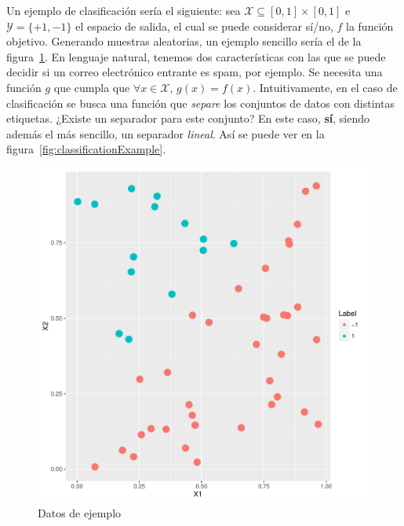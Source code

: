 \documentclass[a4paper,11pt]{book}\usepackage[]{graphicx}\usepackage[]{color}
\makeatletter
\def\maxwidth{ %
  \ifdim\Gin@nat@width>\linewidth
    \linewidth
  \else
    \Gin@nat@width
  \fi
}
\newenvironment{knitrout}{}{} %
\theoremstyle{plain}
\theoremstyle{definition}
\makeatother
\begin{document}
Un ejemplo de clasificación sería el siguiente:
sea $\mathcal{X} \subseteq [0,1] \times [0,1]$ e $\mathcal{Y} = \{+1,-1\}$ el espacio
de salida, el cual se puede considerar sí/no, $f$ la función objetivo.
Generando muestras aleatorias, un ejemplo sencillo sería el de la
figura~\ref{fig:dataExample}. En lenguaje natural, tenemos dos características
con las que se puede decidir si un correo electrónico entrante es spam, por ejemplo.
Se necesita una función $g$ que cumpla que $\forall x \in \mathcal{X}$, $g(x) = f(x)$.
Intuitivamente, en el caso de clasificación se busca una función que \emph{separe}
los conjuntos de datos con distintas etiquetas. ¿Existe un separador para este conjunto?
En este caso, \textbf{sí}, siendo además el más sencillo, un separador \emph{lineal}.
Así se puede ver en la figura~\ref{fig:classificationExample}.





\begin{knitrout}
\color{fgcolor}\begin{figure}
\includegraphics[width=\maxwidth]{figure/dataExample-1} \caption[Datos de ejemplo]{Datos de ejemplo}\label{fig:dataExample}
\end{figure}


\end{knitrout}
\end{document}
